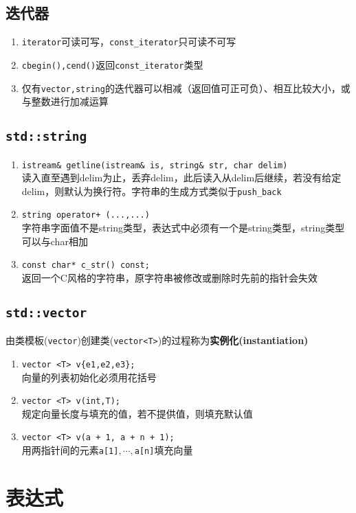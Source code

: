 \documentclass[10pt]{article}
\begin{document}
\subsection{迭代器}
\begin{enumerate}
  \item \texttt{iterator}可读可写，\texttt{const\_iterator}只可读不可写
  \item \texttt{cbegin(),cend()}返回\texttt{const\_iterator}类型
  \item 仅有\texttt{vector,string}的迭代器可以相减（返回值可正可负）、相互比较大小，或与整数进行加减运算
\end{enumerate}
\subsection{\texttt{std::string}}
\begin{enumerate}
  \item \texttt{istream\& getline(istream\& is, string\& str, char delim)}\\读入直至遇到delim为止，丢弃delim，此后读入从delim后继续，若没有给定delim，则默认为换行符。字符串的生成方式类似于\texttt{push\_back}
  \item \texttt{string operator+ (...,...)}\\字符串字面值不是string类型，表达式中必须有一个是string类型，string类型可以与char相加
  \item \texttt{const char* c\_str() const;}\\返回一个C风格的字符串，原字符串被修改或删除时先前的指针会失效
\end{enumerate}
\subsection{\texttt{std::vector}}
\noindent 由类模板(\texttt{vector})创建类(\texttt{vector<T>})的过程称为\textbf{实例化(instantiation)}
\begin{enumerate}
  \item \texttt{vector <T> v\{e1,e2,e3\};}\\向量的列表初始化必须用花括号
  \item \texttt{vector <T> v(int,T);}\\规定向量长度与填充的值，若不提供值，则填充默认值
  \item \texttt{vector <T> v(a + 1, a + n + 1);}\\用两指针间的元素\texttt{a[1]$,\cdots,$a[n]}填充向量
\end{enumerate}
\section{表达式}
\end{document}
